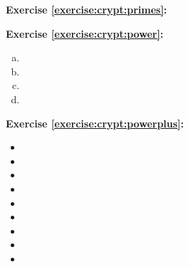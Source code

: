\noindent\textbf{Exercise \ref{exercise:crypt:primes}:}

\noindent\textbf{Exercise \ref{exercise:crypt:power}:}
\begin{enumerate}[(a)]
\item
\item  
\item 
\item 
\end{enumerate}

\noindent\textbf{Exercise \ref{exercise:crypt:powerplus}:}
\begin{itemize}
\item
\item
\item
\item
\item
\item
\item
\item
\item
\end{itemize}
%

